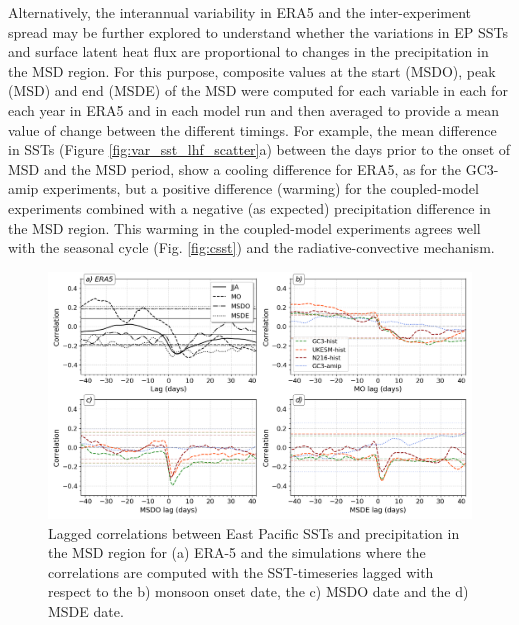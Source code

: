 
Alternatively, the interannual variability in ERA5 and the inter-experiment spread may be further explored to understand whether the variations in EP SSTs and surface latent heat flux are proportional to changes in the precipitation in the MSD region. For this purpose, composite values at the start (MSDO), peak (MSD) and end (MSDE) of the MSD were computed for each variable in each for each year in ERA5 and in each model run and then averaged to provide a mean value of change between the different timings.  For example, the mean difference in SSTs (Figure \ref{fig:var_sst_lhf_scatter}a) between the days prior to the onset of MSD and the MSD period, show a cooling difference for ERA5, as for the GC3-amip experiments, but a positive difference (warming) for the coupled-model experiments combined with a negative (as expected) precipitation difference in the MSD region. This warming in the coupled-model experiments agrees well with the seasonal cycle (Fig. \ref{fig:csst}) and the radiative-convective mechanism. 

\begin{figure}[t!]
\includegraphics[width=\linewidth]{figures/sst_regg.png}
\caption{Lagged correlations between East Pacific SSTs and precipitation in the MSD region for (a) ERA-5 and the simulations where the correlations are computed with the SST-timeseries lagged with respect to the b) monsoon onset date, the c) MSDO date and the d) MSDE date.   }
\label{fig:sst_lag}
\end{figure}

